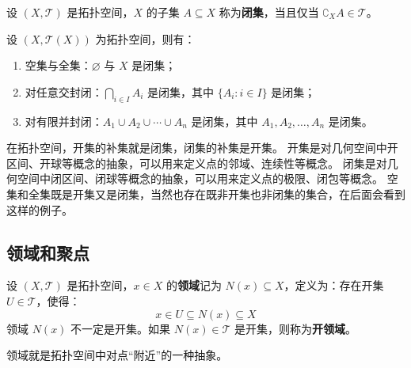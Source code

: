 \begin{definition}
    设 $ (X,\mathcal{T}) $ 是拓扑空间，$ X $ 的子集 $ A\subseteq X $ 称为\textbf{闭集}，当且仅当 $ \complement_X A \in \mathcal{T} $。
    \label{definition:closed_set}
\end{definition}

\begin{proposition}[闭集的性质]
    设 $ (X,\mathcal{T}(X)) $ 为拓扑空间，则有：
    \begin{enumerate}
        \item 空集与全集：$ \varnothing $ 与 $ X $ 是闭集；
        \item 对任意交封闭：$ \bigcap_{i\in I} A_i $ 是闭集，其中 $ \{A_i:i\in I\}$ 是闭集；
        \item 对有限并封闭：$ A_1\cup A_2\cup \cdots \cup A_n $ 是闭集，其中 $ A_1,A_2,\ldots,A_n $ 是闭集。
    \end{enumerate}
\end{proposition}

\begin{note}
    在拓扑空间，开集的补集就是闭集，闭集的补集是开集。
    开集是对几何空间中开区间、开球等概念的抽象，可以用来定义点的邻域、连续性等概念。
    闭集是对几何空间中闭区间、闭球等概念的抽象，可以用来定义点的极限、闭包等概念。
    空集和全集既是开集又是闭集，当然也存在既非开集也非闭集的集合，在后面会看到这样的例子。
\end{note}

\vspace{1em}
\subsection{领域和聚点}

\begin{definition}[领域 Neighborhood]
    设 $(X,\mathcal{T})$ 是拓扑空间，$x\in X$ 的\textbf{领域}记为 $N(x)\subseteq X$，定义为：存在开集 $U\in\mathcal{T}$，使得：
    \[
        x\in U \subseteq N(x) \subseteq X
    \]
    领域 $N(x)$ 不一定是开集。如果 $N(x)\in\mathcal{T}$ 是开集，则称为\textbf{开领域}。
    \label{def:neighborhood}
\end{definition}
\begin{example}
    
\end{example}

\begin{note}
    领域就是拓扑空间中对点“附近”的一种抽象。
\end{note}
\vspace{1em}

